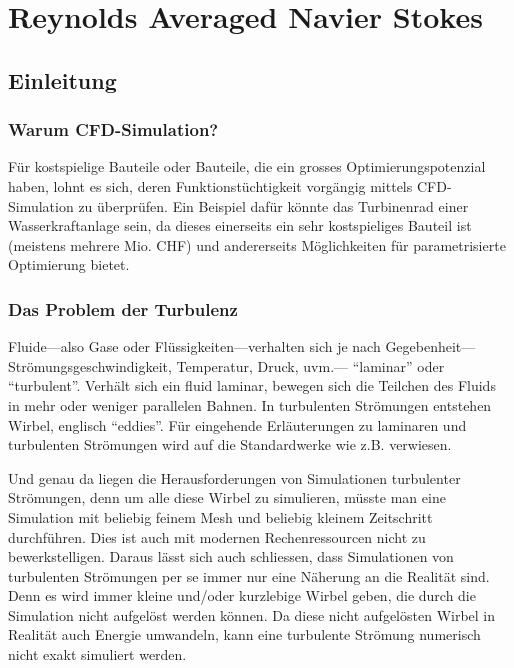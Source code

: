 %
%
%
%
\chapter{Reynolds Averaged Navier Stokes \label{chapter:reynolds}}
\begin{refsection}

\section{Einleitung}

\subsection{Warum CFD-Simulation?}

Für kostspielige Bauteile oder Bauteile, die ein grosses Optimierungspotenzial haben,
lohnt es sich, deren Funktionstüchtigkeit vorgängig mittels CFD-Simulation zu überprüfen.
Ein Beispiel dafür könnte das Turbinenrad einer Wasserkraftanlage sein,
da dieses einerseits ein sehr kostspieliges Bauteil ist (meistens mehrere Mio. CHF)
und andererseits Möglichkeiten für parametrisierte Optimierung bietet.

\subsection{Das Problem der Turbulenz}

Fluide---also Gase oder Flüssigkeiten---verhalten sich je nach Gegebenheit---Strömungs\-ge\-schwindigkeit, Temperatur, Druck, uvm.---
``laminar'' oder ``turbulent''. Verhält sich ein fluid laminar, bewegen sich die Teilchen des Fluids in mehr oder weniger
parallelen Bahnen. In turbulenten Strömungen entstehen Wirbel, englisch ``eddies''. Für eingehende Erläuterungen zu laminaren
und turbulenten Strömungen wird auf die Standardwerke wie z.B. \cite{reynolds:oertel} verwiesen.

Und genau da liegen die Herausforderungen von Simulationen turbulenter Strömungen,
denn um alle diese Wirbel zu simulieren, müsste man eine Simulation mit beliebig feinem Mesh und beliebig kleinem Zeitschritt durchführen.
Dies ist auch mit modernen Rechenressourcen nicht zu bewerkstelligen.
Daraus lässt sich auch schliessen, dass Simulationen von turbulenten Strömungen per se immer nur eine Näherung an die Realität sind.
Denn es wird immer kleine und/oder kurzlebige Wirbel geben, die durch die Simulation nicht aufgelöst werden können.
Da diese nicht aufgelösten Wirbel in Realität auch Energie umwandeln, kann eine turbulente Strömung numerisch nicht exakt simuliert werden.



\end{refsection}
